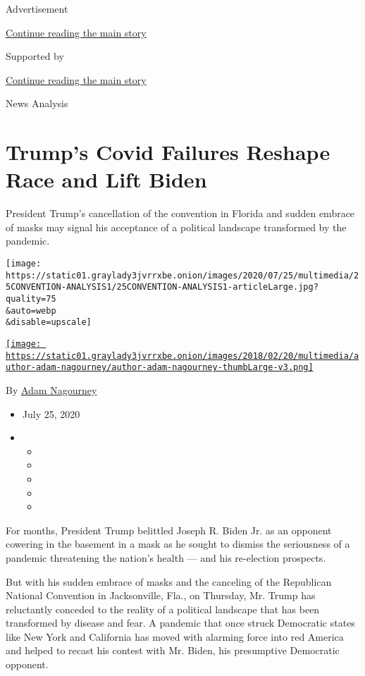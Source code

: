 Advertisement

\protect\hyperlink{after-top}{Continue reading the main story}

Supported by

\protect\hyperlink{after-sponsor}{Continue reading the main story}

News Analysis

\hypertarget{trumps-covid-failures-reshape-race-and-lift-biden}{%
\section{Trump's Covid Failures Reshape Race and Lift
Biden}\label{trumps-covid-failures-reshape-race-and-lift-biden}}

President Trump's cancellation of the convention in Florida and sudden
embrace of masks may signal his acceptance of a political landscape
transformed by the pandemic.

\texttt{[image: https://static01.graylady3jvrrxbe.onion/images/2020/07/25/multimedia/25CONVENTION-ANALYSIS1/25CONVENTION-ANALYSIS1-articleLarge.jpg?quality=75\\\&auto=webp\\\&disable=upscale]}

\href{https://www.nytimes3xbfgragh.onion/by/adam-nagourney}{\texttt{[image: https://static01.graylady3jvrrxbe.onion/images/2018/02/20/multimedia/author-adam-nagourney/author-adam-nagourney-thumbLarge-v3.png]}}

By \href{https://www.nytimes3xbfgragh.onion/by/adam-nagourney}{Adam
Nagourney}

\begin{itemize}
\item
  July 25, 2020
\item
  \begin{itemize}
  \item
  \item
  \item
  \item
  \item
  \end{itemize}
\end{itemize}

For months, President Trump belittled Joseph R. Biden Jr. as an opponent
cowering in the basement in a mask as he sought to dismiss the
seriousness of a pandemic threatening the nation's health --- and his
re-election prospects.

But with his sudden embrace of masks and the canceling of the Republican
National Convention in Jacksonville, Fla., on Thursday, Mr. Trump has
reluctantly conceded to the reality of a political landscape that has
been transformed by disease and fear. A pandemic that once struck
Democratic states like New York and California has moved with alarming
force into red America and helped to recast his contest with Mr. Biden,
his presumptive Democratic opponent.

